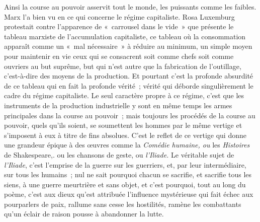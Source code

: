\documentclass[french,twoside]{book} %
\begin{document}
Ainsi la course au pouvoir asservit tout le monde, les puissants comme les faibles. Marx l'a bien vu en ce qui concerne le régime capitaliste. Rosa Luxemburg protestait contre l'apparence de « carrousel dans le vide » que présente le tableau marxiste de l'accumulation capitaliste, ce tableau où la consommation apparaît comme un « mal nécessaire » à réduire au minimum, un simple moyen pour maintenir en vie ceux qui se consacrent soit comme chefs soit comme ouvriers au but suprême, but qui n'est autre que la fabrication de l'outillage, c'est-à-dire des moyens de la production. Et pourtant c'est la profonde absurdité de ce tableau qui en fait la profonde vérité ; vérité qui déborde singulièrement le cadre du régime capitaliste. Le seul caractère propre à ce régime, c'est que les instruments de la production industrielle y sont en même temps les armes principales dans la course au pouvoir ; mais toujours les procédés de la course au pouvoir, quels qu'ils soient, se soumettent les hommes par le même vertige et s'imposent à eux à titre de fins absolues. C'est le reflet de ce vertige qui donne une grandeur épique à des œuvres comme la {\itshape Comédie humaine, ou} les {\itshape Histoires} de Shakespeare,. ou les chansons de geste, ou {\itshape l'Iliade.} Le véritable sujet de {\itshape l'Iliade}, c'est l'emprise de la guerre sur les guerriers, et, par leur intermédiaire, sur tous les humains ; nul ne sait pourquoi chacun se sacrifie, et sacrifie tous les siens, à une guerre meurtrière et sans objet, et c'est pourquoi, tout au long du poème, c'est aux dieux qu'est attribuée l'influence mystérieuse qui fait échec aux pourparlers de paix, rallume sans cesse les hostilités, ramène les combattants qu'un éclair de raison pousse à abandonner la lutte.\par
\par
\end{document}
